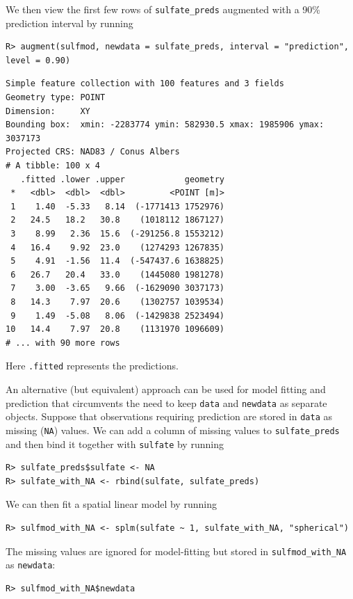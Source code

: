 \documentclass[10pt,letterpaper]{article}
\begin{document}
We then view the first few rows of \texttt{sulfate\_preds} augmented
with a 90\% prediction interval by running

\begin{verbatim}
R> augment(sulfmod, newdata = sulfate_preds, interval = "prediction", level = 0.90)
\end{verbatim}

\begin{verbatim}
Simple feature collection with 100 features and 3 fields
Geometry type: POINT
Dimension:     XY
Bounding box:  xmin: -2283774 ymin: 582930.5 xmax: 1985906 ymax: 3037173
Projected CRS: NAD83 / Conus Albers
# A tibble: 100 x 4
   .fitted .lower .upper            geometry
 *   <dbl>  <dbl>  <dbl>         <POINT [m]>
 1    1.40  -5.33   8.14  (-1771413 1752976)
 2   24.5   18.2   30.8    (1018112 1867127)
 3    8.99   2.36  15.6  (-291256.8 1553212)
 4   16.4    9.92  23.0    (1274293 1267835)
 5    4.91  -1.56  11.4  (-547437.6 1638825)
 6   26.7   20.4   33.0    (1445080 1981278)
 7    3.00  -3.65   9.66  (-1629090 3037173)
 8   14.3    7.97  20.6    (1302757 1039534)
 9    1.49  -5.08   8.06  (-1429838 2523494)
10   14.4    7.97  20.8    (1131970 1096609)
# ... with 90 more rows
\end{verbatim}

Here \texttt{.fitted} represents the predictions.

An alternative (but equivalent) approach can be used for model fitting
and prediction that circumvents the need to keep \texttt{data} and
\texttt{newdata} as separate objects. Suppose that observations
requiring prediction are stored in \texttt{data} as missing
(\texttt{NA}) values. We can add a column of missing values to
\texttt{sulfate\_preds} and then bind it together with \texttt{sulfate}
by running

\begin{verbatim}
R> sulfate_preds$sulfate <- NA
R> sulfate_with_NA <- rbind(sulfate, sulfate_preds)
\end{verbatim}

We can then fit a spatial linear model by running

\begin{verbatim}
R> sulfmod_with_NA <- splm(sulfate ~ 1, sulfate_with_NA, "spherical")
\end{verbatim}

The missing values are ignored for model-fitting but stored in
\texttt{sulfmod\_with\_NA} as \texttt{newdata}:

\begin{verbatim}
R> sulfmod_with_NA$newdata
\end{verbatim}
\end{document}
